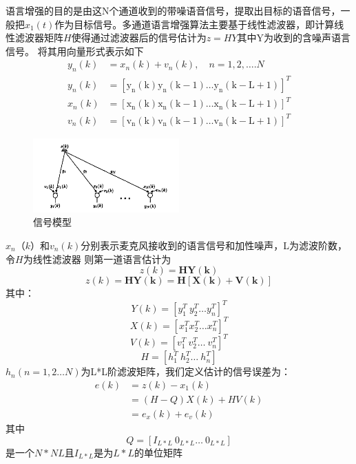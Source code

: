 语言增强的目的是由这N个通道收到的带噪语音信号，提取出目标的语音信号，一般把$x_1(t)$作为目标信号。多通道语言增强算法\cite{ref1}主要基于线性滤波器，即计算线性滤波器矩阵$H$使得通过滤波器后的信号估计为$z=HY$其中Y为收到的含噪声语言信号。
将其用向量形式表示如下
\begin{align}
		y_{n}(k)&=x_{n}(k)+v_{n}(k), \quad n=1,2, \ldots . N \\
		y_{n}(k)&=\left[\mathrm{y}_{\mathrm{n}}(\mathrm{k}) \mathrm{y}_{\mathrm{n}}(\mathrm{k}-1) \ldots \mathrm{y}_{\mathrm{n}}(\mathrm{k}-\mathrm{L}+1)\right]^{T} \\
		x_{n}(k)&=\left[\mathrm{x}_{\mathrm{n}}(\mathrm{k}) \mathrm{x}_{\mathrm{n}}(\mathrm{k}-1) \ldots \mathrm{x}_{\mathrm{n}}(\mathrm{k}-\mathrm{L}+1)\right]^{T} \\
		v_{n}(k)&=\left[\mathrm{v}_{\mathrm{n}}(\mathrm{k}) \mathrm{v}_{\mathrm{n}}(\mathrm{k}-1) \ldots \mathrm{v}_{\mathrm{n}}(\mathrm{k}-\mathrm{L}+1)\right]^{T}
\end{align}

\begin{figure}[h]
	\centering
	\includegraphics[width=0.5\textwidth]{mod.PNG}
	\caption{信号模型}
	\label{mod}
\end{figure}
$x_n（k）$和$v_n(k)$分别表示麦克风接收到的语言信号和加性噪声，L为滤波阶数，令$H$为线性滤波器
则第一道语言估计为
\begin{equation}
	z(k)=\mathbf{HY(k)}
\end{equation}
\begin{equation}
	z(k)=\mathbf{HY(k)}=\mathbf{H[X(k)+V(k)]} \label{3}
\end{equation}
其中：
\begin{equation}
	Y(k)=[y_1^T\  y_2^T\ldots y_n^T]^T
\end{equation}
\begin{equation}
	X(k)=[x_1^T x_2^T\ldots x_n^T]^T
\end{equation}
\begin{equation}
	V(k)=[v_1^T \ v_2^T\ldots\  v_n^T]^T
\end{equation}
\begin{equation}
	H=[h_1^T\ h_2^T\ldots\ h_n^T]
\end{equation}
$h_n(n=1,2\ldots N)$为L*L阶滤波矩阵，我们定义估计的信号误差为：
\begin{align}
	e(k) &= z(k) - x_1(k) \\
	&= (H-Q)X(k) + HV(k) \\
	&= e_x(k) + e_v(k)
\end{align}
其中\[ Q=[I_{L*L}\ 0_{L*L}\ldots\ 0_{L*L}] \]
是一个$N*NL$且$I_{L*L}$是为$L*L$的单位矩阵
